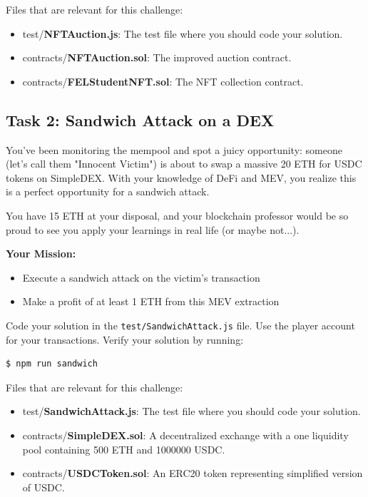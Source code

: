 \documentclass[12pt]{article}
\begin{document}
\noindent
Files that are relevant for this challenge:
\begin{itemize}
\item test/\textbf{NFTAuction.js}: The test file where you should code your solution.
\item contracts/\textbf{NFTAuction.sol}: The improved auction contract.
\item contracts/\textbf{FELStudentNFT.sol}: The NFT collection contract.
\end{itemize}

\subsection*{Task 2: Sandwich Attack on a DEX}

You've been monitoring the mempool and spot a juicy opportunity: someone (let's call them "Innocent Victim") is about to swap a massive 20 ETH for USDC tokens on SimpleDEX. With your knowledge of DeFi and MEV, you realize this is a perfect opportunity for a sandwich attack.

You have 15 ETH at your disposal, and your blockchain professor would be so proud to see you apply your learnings in real life (or maybe not...).

\medskip
\noindent
\textbf{Your Mission:}
\begin{itemize}
  \item Execute a sandwich attack on the victim's transaction
  \item Make a profit of at least 1 ETH from this MEV extraction
\end{itemize}

\noindent
Code your solution in the \texttt{test/SandwichAttack.js} file. Use the player account for your transactions. Verify your solution by running:

\begin{verbatim}
$ npm run sandwich
\end{verbatim}

\noindent
Files that are relevant for this challenge:
\begin{itemize}
\item test/\textbf{SandwichAttack.js}: The test file where you should code your solution.
\item contracts/\textbf{SimpleDEX.sol}: A decentralized exchange with a one liquidity pool containing 500 ETH and 1000000 USDC.
\item contracts/\textbf{USDCToken.sol}: An ERC20 token representing simplified version of USDC.
\end{itemize}
\end{document}
